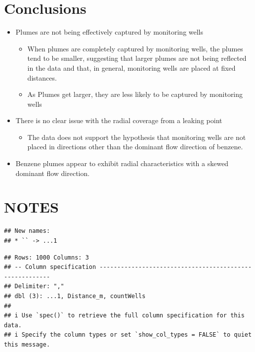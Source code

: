 \documentclass[draft,linenumbers]{agujournal2018}
\providecommand{\tightlist}{%
  \setlength{\itemsep}{0pt}\setlength{\parskip}{0pt}}
\begin{document}
\section{Conclusions}

\begin{itemize}
\item
  Plumes are not being effectively captured by monitoring wells

  \begin{itemize}
  \item
    When plumes are completely captured by monitoring wells, the plumes
    tend to be smaller, suggesting that larger plumes are not being
    reflected in the data and that, in general, monitoring wells are
    placed at fixed distances.
  \item
    As Plumes get larger, they are less likely to be captured by
    monitoring wells
  \end{itemize}
\item
  There is no clear issue with the radial coverage from a leaking point

  \begin{itemize}
  \tightlist
  \item
    The data does not support the hypothesis that monitoring wells are
    not placed in directions other than the dominant flow direction of
    benzene.
  \end{itemize}
\item
  Benzene plumes appear to exhibit radial characteristics with a skewed
  dominant flow direction.
\end{itemize}

\section{NOTES}

\begin{verbatim}
## New names:
## * `` -> ...1
\end{verbatim}

\begin{verbatim}
## Rows: 1000 Columns: 3
## -- Column specification --------------------------------------------------------
## Delimiter: ","
## dbl (3): ...1, Distance_m, countWells
## 
## i Use `spec()` to retrieve the full column specification for this data.
## i Specify the column types or set `show_col_types = FALSE` to quiet this message.
\end{verbatim}
\end{document}
